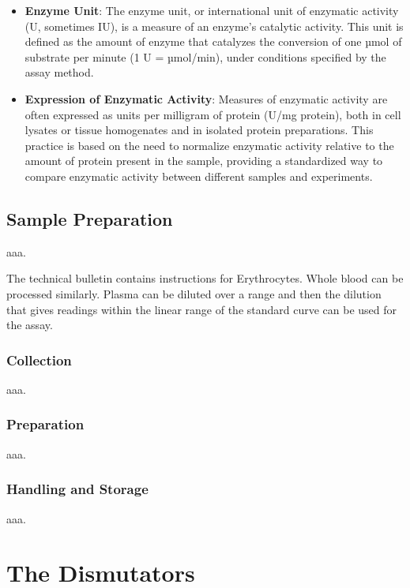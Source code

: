 \documentclass[
  9pt,
  american,
  a5paper,
  extrafontsizes,onecolumn,openright
  ]{memoir}
\begin{document}
\begin{itemize}
\item
  \textbf{Enzyme Unit}: The enzyme unit, or international unit of enzymatic activity (U, sometimes IU), is a measure of an enzyme's catalytic activity. This unit is defined as the amount of enzyme that catalyzes the conversion of one µmol of substrate per minute (1 U = µmol/min), under conditions specified by the assay method.
\item
  \textbf{Expression of Enzymatic Activity}: Measures of enzymatic activity are often expressed as units per milligram of protein (U/mg protein), both in cell lysates or tissue homogenates and in isolated protein preparations. This practice is based on the need to normalize enzymatic activity relative to the amount of protein present in the sample, providing a standardized way to compare enzymatic activity between different samples and experiments.
\end{itemize}

\chapter{Sample Preparation}\label{chapter4}

aaa.

The technical bulletin contains instructions for Erythrocytes. Whole blood can be processed
similarly. Plasma can be diluted over a range and then the dilution that gives readings within the
linear range of the standard curve can be used for the assay.

\section{Collection}\label{collection}

aaa.

\section{Preparation}\label{preparation}

aaa.

\section{Handling and Storage}\label{handling-and-storage}

aaa.

\part{The Dismutators}\label{part-the-dismutators}
\end{document}
